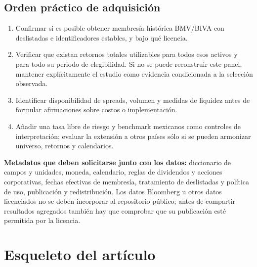 \documentclass[11pt]{article}
\begin{document}
\subsection{Orden práctico de adquisición}

\begin{enumerate}
\item Confirmar si es posible obtener membresía histórica BMV/BIVA con
deslistadas e identificadores estables, y bajo qué licencia.
\item Verificar que existan retornos totales utilizables para todos esos
activos y para todo su periodo de elegibilidad. Si no se puede reconstruir
este panel, mantener explícitamente el estudio como evidencia condicionada a
la selección observada.
\item Identificar disponibilidad de spreads, volumen y medidas de liquidez
antes de formular afirmaciones sobre costos o implementación.
\item Añadir una tasa libre de riesgo y benchmark mexicanos como controles de
interpretación; evaluar la extensión a otros países sólo si se pueden
armonizar universo, retornos y calendarios.
\end{enumerate}

\noindent\textbf{Metadatos que deben solicitarse junto con los datos:}
diccionario de campos y unidades, moneda, calendario, reglas de dividendos y
acciones corporativas, fechas efectivas de membresía, tratamiento de
deslistadas y política de uso, publicación y redistribución. Los datos
Bloomberg u otros datos licenciados no se deben incorporar al repositorio
público; antes de compartir resultados agregados también hay que comprobar
que su publicación esté permitida por la licencia.

\section{Esqueleto del artículo}
\end{document}
